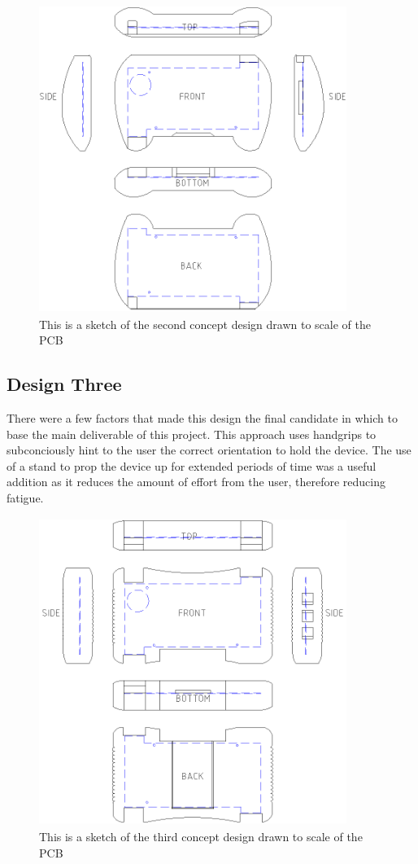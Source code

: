 \begin{figure}[hbt!]
\centering
\includegraphics[width=10cm,height=10cm,keepaspectratio]{Figures/design2_sketch.png}
\caption{This is a sketch of the second concept design drawn to scale of the PCB}
\label{fig:Design_2}
\end{figure}

\subsection{Design Three}

There were a few factors that made this design the final candidate in which to base the main deliverable of this project.
This approach uses handgrips to subconciously hint to the user the correct orientation to hold the device.
The use of a stand to prop the device up for extended periods of time was a useful addition as it reduces the amount of effort from the user, therefore reducing fatigue.

\begin{figure}[hbt!]
\centering
\includegraphics[width=10cm,height=10cm,keepaspectratio]{Figures/design3_sketch.png}
\caption{This is a sketch of the third concept design drawn to scale of the PCB}
\label{fig:Design_3}
\end{figure}

